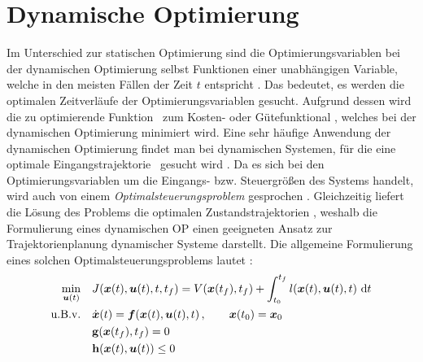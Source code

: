 \section{Dynamische Optimierung}\label{sec:dynamischeOpt}
Im Unterschied zur statischen Optimierung sind die Optimierungsvariablen bei der dynamischen Optimierung selbst Funktionen einer unabhängigen Variable, welche in den meisten Fällen der Zeit $t$ entspricht \cite{KnutGraichen.2012}. Das bedeutet, es werden die optimalen Zeitverläufe der Optimierungsvariablen gesucht. Aufgrund dessen wird die zu optimierende Funktion \fofx~zum Kosten- oder Gütefunktional \J, welches bei der dynamischen Optimierung minimiert wird. Eine sehr häufige Anwendung der dynamischen Optimierung findet man bei dynamischen Systemen, für die eine optimale Eingangstrajektorie \uoptoft~gesucht wird \cite{KnutGraichen.2012}. Da es sich bei den Optimierungsvariablen um die Eingangs- bzw. Steuergrößen des Systems handelt, wird auch von einem \textit{Optimalsteuerungsproblem} gesprochen \cite{KnutGraichen.2012}. Gleichzeitig liefert die Lösung des Problems die optimalen Zustandstrajektorien \xoptoft, weshalb die Formulierung eines dynamischen \gls{OP} einen geeigneten Ansatz zur Trajektorienplanung dynamischer Systeme darstellt. 
Die allgemeine Formulierung eines solchen Optimalsteuerungsproblems lautet \cite{KnutGraichen.2012}:
\begin{align}
\min_{\boldsymbol{u}(t)} \quad &J(\boldsymbol{x}(t),\boldsymbol{u}(t),t,t_f) = V(\boldsymbol{x}(t_f),t_f) + \int_{t_0}^{t_f}l(\boldsymbol{x}(t),\boldsymbol{u}(t),t)~\textrm{d}{t} \label{eq:J_dyn}\\
\textrm{u.B.v.} \quad& \dot{\boldsymbol{x}}(t) = \boldsymbol{f}(\boldsymbol{x}(t),\boldsymbol{u}(t),t)\,,\qquad \boldsymbol{x}(t_0) = \boldsymbol{x}_0 \label{eq:system_anfang}\\
&\mathbf{g}(\boldsymbol{x}(t_f),t_f) = 0 \label{eq:GNB}\\
&\mathbf{h}(\boldsymbol{x}(t),\boldsymbol{u}(t)) \leq 0 \label{eq:UNB}
\end{align}
